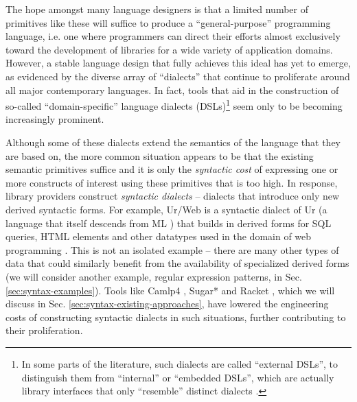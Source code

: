 The hope amongst many language designers is that a limited number of primitives like these will suffice to produce a ``general-purpose'' programming language, i.e. one where programmers can direct their efforts almost exclusively toward the development of libraries for a wide variety of application domains. However, a stable language design that fully achieves this ideal has yet to emerge, as evidenced by the diverse array of ``dialects'' that continue to proliferate around all major contemporary languages. 
In fact, tools that aid in the construction of so-called  ``domain-specific'' language dialects (DSLs)\footnote{In some parts of the literature, such dialects are called ``external DSLs'', to distinguish them from  ``internal'' or ``embedded DSLs'', which are actually  library interfaces that only ``resemble'' distinct dialects \cite{fowler2010domain}.} seem only to be becoming increasingly prominent. 

Although some of these dialects extend the semantics of the language that they are based on, the more common situation appears to be that the existing semantic primitives suffice and it is only the \emph{syntactic cost} of expressing one or more constructs of interest using these primitives  that is too high. In response, library providers construct \emph{syntactic dialects} -- dialects that introduce only new derived syntactic forms. 
For example, Ur/Web is a syntactic dialect of Ur (a language that itself descends from ML \cite{conf/pldi/Chlipala10}) that builds in derived forms for SQL queries, HTML elements and other datatypes used in the domain of web programming \cite{conf/popl/Chlipala15}. %
This is not an isolated example -- there are many other types of data that could similarly benefit from the availability of specialized derived forms (we will consider another example, regular expression patterns, in Sec. \ref{sec:syntax-examples}). 
Tools like Camlp4 \cite{ocaml-manual}, Sugar* \cite{erdweg2011sugarj,erdweg2013framework} and Racket \cite{Flatt:2012:CLR:2063176.2063195}, which we will discuss in Sec. \ref{sec:syntax-existing-approaches}, have lowered the engineering costs of constructing syntactic dialects in such situations, further contributing to their proliferation. 

